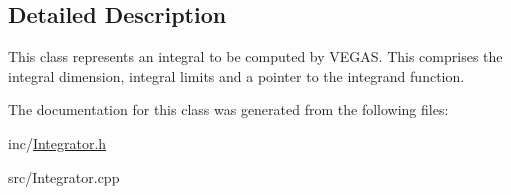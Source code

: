\subsection{Detailed Description}
This class represents an integral to be computed by V\-E\-G\-A\-S. This comprises the integral dimension, integral limits and a pointer to the integrand function. 

The documentation for this class was generated from the following files\-:\begin{DoxyCompactItemize}
\item 
inc/\hyperlink{Integrator_8h}{Integrator.\-h}\item 
src/Integrator.\-cpp\end{DoxyCompactItemize}
